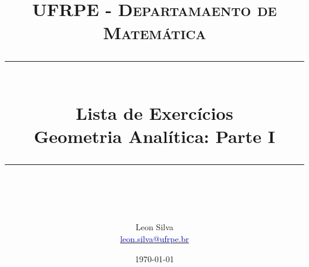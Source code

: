 \documentclass[paper=a4, fontsize=11pt]{scrartcl} %
\begin{document}
\newcommand{\horrule}[1]{\rule{\linewidth}{#1}} %

\title{	
\normalfont \normalsize 
\textsc{UFRPE - Departamaento de Matemática} \\ [25pt] %
\horrule{0.5pt} \\[0.1cm] %
\huge Lista de Exercícios\\ Geometria Analítica: Parte I \\ %
\horrule{2pt} \\[0.5cm] %
}

\author{Leon Silva\\\href{mailto:leon.silva@ufrpe.br}{\textcolor{blue}{leon.silva@ufrpe.br}}} %

\date{\normalsize\today} %



\maketitle 
\begin{enumerate}[labelwidth=0.5cm,align=left]


\end{enumerate}

\end{document}
